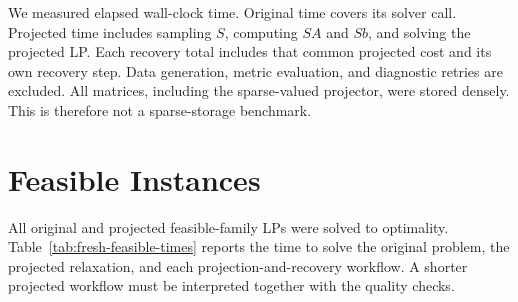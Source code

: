 \documentclass[12pt,letterpaper,oneside]{report}
\theoremstyle{definition}
\begin{document}
We measured elapsed wall-clock time. Original time covers its solver
call. Projected time includes sampling $S$, computing $SA$ and $Sb$,
and solving the projected LP. Each recovery total includes that common
projected cost and its own recovery step. Data generation, metric
evaluation, and diagnostic retries are excluded. All matrices, including
the sparse-valued projector, were stored densely. This is therefore not
a sparse-storage benchmark.

\section{Feasible Instances}
All original and projected feasible-family LPs were solved to optimality.
Table~\ref{tab:fresh-feasible-times} reports the time to solve the original problem,
the projected relaxation, and each projection-and-recovery workflow.
A shorter projected workflow must be interpreted together with the
quality checks.

\par\medskip
\noindent\begin{minipage}{\linewidth}
\small\linespread{1}\selectfont\centering
\setlength{\tabcolsep}{4pt}
\renewcommand{\arraystretch}{1.08}
\label{tab:fresh-feasible-times}
\medskip
{}%
\ifdim\wd0>\linewidth
  \resizebox{\linewidth}{!}{\usebox0}
\else
  \usebox0
\fi
\end{minipage}
\par\medskip
\end{document}
